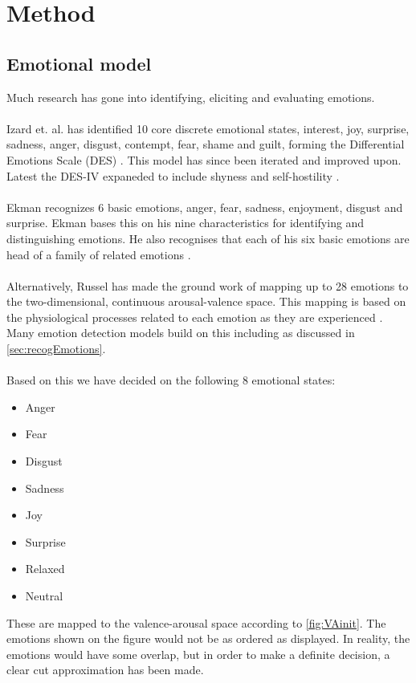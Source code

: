 \chapter{Method}
\section{Emotional model}\label{sec:emotionalModel}
Much research has gone into identifying, eliciting and evaluating emotions.\\\\
Izard et. al. has identified 10 core discrete emotional states, interest, joy, surprise, sadness, anger, disgust, contempt, fear, shame and guilt, forming the Differential Emotions Scale (DES) \cite{des-boyle, humanemotionsIzard}. This model has since been iterated and improved upon. Latest the DES-IV expaneded to include shyness and self-hostility \cite{desiv,desivBoyle}.\\\\
Ekman recognizes 6 basic emotions, anger, fear, sadness, enjoyment, disgust and surprise. Ekman bases this on his nine characteristics for identifying and distinguishing emotions. He also recognises that each of his six basic emotions are head of a family of related emotions \cite{ekman1992argument}.\\\\
Alternatively, Russel has made the ground work of mapping up to 28 emotions to the two-dimensional, continuous arousal-valence space. This mapping is based on the physiological processes related to each emotion as they are experienced \cite{ValArouModelOrg}. Many emotion detection models build on this including  \cite{RecognizingEmotion, EmotionSense, BioSignalsEmotionModel} as discussed in \cref{sec:recogEmotions}.\\\\
Based on this we have decided on the following 8 emotional states:
\begin{itemize}
    \item Anger
    \item Fear
    \item Disgust
    \item Sadness
    \item Joy
    \item Surprise
    \item Relaxed
    \item Neutral
\end{itemize}

These are mapped to the valence-arousal space according to \cref{fig:VAinit}. The emotions shown on the figure would not be as ordered as displayed. In reality, the emotions would have some overlap, but in order to make a definite decision, a clear cut approximation has been made.


